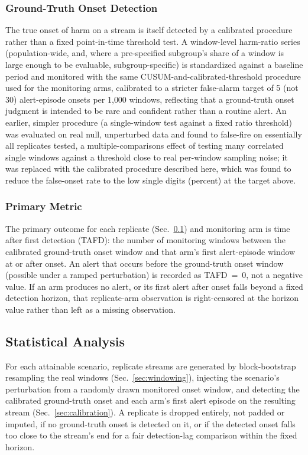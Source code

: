 \documentclass[apajournal,article,submit,oneauthor]{Definitions/mdpi}
\begin{document}
\subsubsection{Ground-Truth Onset Detection}

The true onset of harm on a stream is itself detected by a calibrated procedure rather than a fixed point-in-time threshold test. A window-level harm-ratio series (population-wide, and, where a pre-specified subgroup's share of a window is large enough to be evaluable, subgroup-specific) is standardized against a baseline period and monitored with the same CUSUM-and-calibrated-threshold procedure used for the monitoring arms, calibrated to a stricter false-alarm target of 5 (not 30) alert-episode onsets per 1{,}000 windows, reflecting that a ground-truth onset judgment is intended to be rare and confident rather than a routine alert. An earlier, simpler procedure (a single-window test against a fixed ratio threshold) was evaluated on real null, unperturbed data and found to false-fire on essentially all replicates tested, a multiple-comparisons effect of testing many correlated single windows against a threshold close to real per-window sampling noise; it was replaced with the calibrated procedure described here, which was found to reduce the false-onset rate to the low single digits (percent) at the target above.

\subsubsection{Primary Metric}

The primary outcome for each replicate (Sec.~\ref{sec:stats}) and monitoring arm is time after first detection (TAFD): the number of monitoring windows between the calibrated ground-truth onset window and that arm's first alert-episode window at or after onset. An alert that occurs before the ground-truth onset window (possible under a ramped perturbation) is recorded as TAFD~=~0, not a negative value. If an arm produces no alert, or its first alert after onset falls beyond a fixed detection horizon, that replicate-arm observation is right-censored at the horizon value rather than left as a missing observation.

\subsection{Statistical Analysis}\label{sec:stats}

For each attainable scenario, replicate streams are generated by block-bootstrap resampling the real windows (Sec.~\ref{sec:windowing}), injecting the scenario's perturbation from a randomly drawn monitored onset window, and detecting the calibrated ground-truth onset and each arm's first alert episode on the resulting stream (Sec.~\ref{sec:calibration}). A replicate is dropped entirely, not padded or imputed, if no ground-truth onset is detected on it, or if the detected onset falls too close to the stream's end for a fair detection-lag comparison within the fixed horizon.
\end{document}
